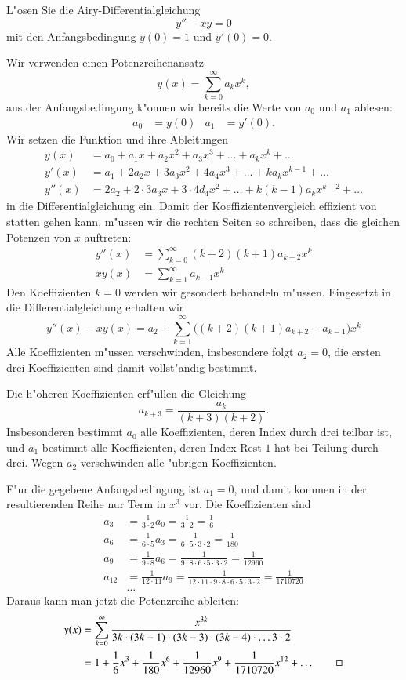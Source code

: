 L"osen Sie die Airy-Differentialgleichung
\[
y''-xy=0
\]
mit den Anfangsbedingung $y(0)=1$ und $y'(0)=0$.
%

\begin{loesung}
Wir verwenden einen Potenzreihenansatz
\[
y(x)=\sum_{k=0}^\infty a_kx^k,
\]
aus der Anfangsbedingung k"onnen wir bereits die Werte von $a_0$ und
$a_1$ ablesen:
\begin{align*}
a_0&=y(0)&
a_1&=y'(0).
\end{align*}
Wir setzen die Funktion und ihre Ableitungen
\begin{align*}
y(x)&=a_0+a_1x+a_2x^2+a_3x^3+\dots+a_kx^k+\dots
\\
y'(x)&=a_1+2a_2x+3a_3x^2+4a_4x^3+\dots+ka_kx^{k-1}+\dots
\\
y''(x)&=2a_2+2\cdot 3a_3x + 3\cdot 4d_4x^2+\dots +k(k-1)a_kx^{k-2}+\dots
\end{align*}
in die Differentialgleichung ein.
Damit der Koeffizientenvergleich effizient von statten gehen kann,
m"ussen wir die rechten Seiten so schreiben, dass die gleichen Potenzen
von $x$ auftreten:
\begin{align*}
y''(x)
&=
\sum_{k=0}^\infty (k+2)(k+1)a_{k+2}x^k
\\
xy(x)
&=
\sum_{k=1}^\infty a_{k-1}x^k
\end{align*}
Den Koeffizienten $k=0$ werden wir gesondert behandeln m"ussen.
Eingesetzt in die Differentialgleichung erhalten wir
\[
y''(x)-xy(x)
=
a_2 + \sum_{k=1}^\infty \bigl((k+2)(k+1)a_{k+2}-a_{k-1}\bigr)x^k
\]
Alle Koeffizienten m"ussen verschwinden, insbesondere folgt $a_2=0$,
die ersten drei Koeffizienten sind damit vollst"andig bestimmt.

Die h"oheren Koeffizienten erf"ullen die Gleichung
\[
a_{k+3}=\frac{a_k}{(k+3)(k+2)}.
\]
Insbesonderen bestimmt $a_0$ alle Koeffizienten, deren Index durch
drei teilbar ist, und $a_1$ bestimmt alle Koeffizienten, deren Index
Rest $1$ hat bei Teilung durch drei.
Wegen $a_2$ verschwinden alle "ubrigen Koeffizienten.

F"ur die gegebene Anfangsbedingung ist $a_1=0$, und damit kommen in der
resultierenden Reihe nur Term in $x^3$ vor.
Die Koeffizienten sind
\begin{align*}
a_3&=\frac1{3\cdot 2}a_0=\frac1{3\cdot 2}=\frac16\\
a_6&=\frac1{6\cdot 5}a_3=\frac1{6\cdot 5\cdot 3\cdot 2}=\frac1{180}\\
a_9&=\frac1{9\cdot 8}a_6=\frac1{9\cdot 8\cdot 6\cdot 5\cdot 3\cdot 2}=\frac1{12960}\\
a_{12}&=\frac1{12\cdot 11}a_9=\frac1{12\cdot 11\cdot 9\cdot 8\cdot 6\cdot 5\cdot 3\cdot 2}=\frac1{1710720}
\\
&\dots
\end{align*}
Daraus kann man jetzt die Potenzreihe ableiten:
\begin{align*}
y(x)
&=
\sum_{k=0}^\infty \frac{x^{3k}}{3k\cdot(3k-1)\cdot (3k-3)\cdot(3k-4)\cdot \dots 3\cdot 2}
\\
&=
1 + \frac16x^3+\frac1{180}x^6+\frac1{12960}x^9+\frac1{1710720}x^{12}+\dots
\qedhere
\end{align*}
\end{loesung}

